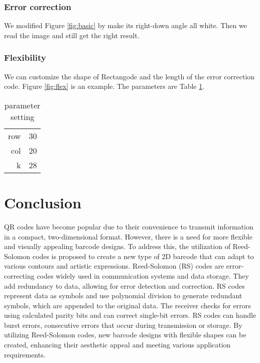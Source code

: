 \documentclass[12pt]{article}
\begin{document}
\subsubsection{Error correction}
We modified Figure \ref{fig:basic} by make its right-down angle all white. Then we read the image and still get the right result.

\subsubsection{Flexibility}
We can customize the shape of Rectangode and the length of the error correction code. Figure \ref{fig:flex} is an example. The parameters are Table \ref{tab:flex}.
\begin{table}[htbp]
    \centering
    \begin{tabular}{r|l}
        row & 30\\
        col & 20\\
          k & 28\\
    \end{tabular}
    \caption{parameter setting}
    \label{tab:flex}
\end{table}


\section{Conclusion}
QR codes have become popular due to their convenience to transmit information in a compact, two-dimensional format. However, there is a need for more flexible and visually appealing barcode designs. To address this, the utilization of Reed-Solomon codes is proposed to create a new type of 2D barcode that can adapt to various contours and artistic expressions. Reed-Solomon (RS) codes are error-correcting codes widely used in communication systems and data storage. They add redundancy to data, allowing for error detection and correction. RS codes represent data as symbols and use polynomial division to generate redundant symbols, which are appended to the original data. The receiver checks for errors using calculated parity bits and can correct single-bit errors. RS codes can handle burst errors, consecutive errors that occur during transmission or storage. By utilizing Reed-Solomon codes, new barcode designs with flexible shapes can be created, enhancing their aesthetic appeal and meeting various application requirements.






\end{document}
